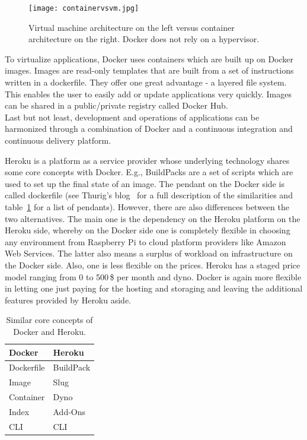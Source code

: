 \begin{figure}[ht]
	\centering
  \texttt{[image: containervsvm.jpg]}
	\caption[Docker vs Virtual Machine Architecture]{Virtual machine architecture on the left versus container architecture on the right. Docker does not rely on a hypervisor.~\cite{Wurbs2017Docker2018.}}
	\label{container}
\end{figure}

To virtualize applications, Docker uses containers which are built up on Docker images. Images are read-only templates that are built from a set of instructions written in a dockerfile. They offer one great advantage - a layered file system. This enables the user to easily add or update applications very quickly. Images can be shared in a public/private registry called Docker Hub. \\
Last but not least, development and operations of applications can be harmonized through a combination of Docker and a continuous integration and continuous delivery platform. 

Heroku is a platform as a service provider whose underlying technology shares some core concepts with Docker. E.g., BuildPacks are a set of scripts which are used to set up the final state of an image. The pendant on the Docker side is called dockerfile (see Thurig's blog~\cite{Thurig2014Docker2018} for a full description of the similarities and table~\ref{dockerandheroku} for a list of pendants). However, there are also differences between the two alternatives. The main one is the dependency on the Heroku platform on the Heroku side, whereby on the Docker side one is completely flexible in choosing any environment from Raspberry Pi to cloud platform providers like Amazon Web Services. The latter also means a surplus of workload on infrastructure on the Docker side. Also, one is less flexible on the prices. Heroku has a staged price model ranging from 0 to 500\,\$ per month and dyno. Docker is again more flexible in letting one just paying for the hosting and storaging and leaving the additional features provided by Heroku aside.~\cite{Chris2017Why2018} 


\begin{table}
\begin{center}
      \caption[Similar core concepts of Docker and Heroku]{Similar core concepts of Docker and Heroku. \cite{Thurig2014Docker2018}}
  \begin{tabular}{ l | l }
    Docker & Heroku  \\ \hline
Dockerfile &	BuildPack \\ 
Image	& Slug\\ 
Container&	Dyno\\ 
Index	&Add-Ons\\ 
CLI	&CLI
  \end{tabular}
  \label{dockerandheroku}
\end{center}
\end{table}

